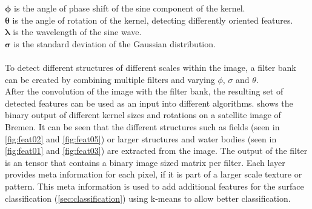 \documentclass[12pt,a4paper, english,twoside]{scrartcl}
\begin{document}
        $\boldsymbol{\phi}$ is the angle of phase shift of the sine component of the kernel. \\
        $\boldsymbol{\theta}$ is the angle of rotation of the kernel, detecting differently oriented features.\\
        $\boldsymbol{\lambda}$ is the wavelength of the sine wave. \\
        $\boldsymbol{\sigma}$ is the standard deviation of the Gaussian distribution.\\ \\
      \noindent
      To detect different structures of different scales within the image, a filter bank can be created by combining multiple filters and varying $\phi$, $\sigma$ and $\theta$.\\
      After the convolution of the image with the filter bank, the resulting set of detected features can be used as an input into different algorithms.
       shows the binary output of different kernel sizes and rotations on a satellite image of Bremen. 
      It can be seen that the different structures such as fields (seen in \cref{fig:feat02} and \cref{fig:feat05}) or larger structures and water bodies (seen in \cref{fig:feat01} and \cref{fig:feat03}) are extracted from the image.
      The output of the filter is an tensor that contains a binary image sized matrix per filter. 
      Each layer provides meta information for each pixel, if it is part of a larger scale texture or pattern. 
      This meta information is used to add additional features for the surface classification (\cref{sec:classification}) using k-means %
      to allow better classification.%
\end{document}
